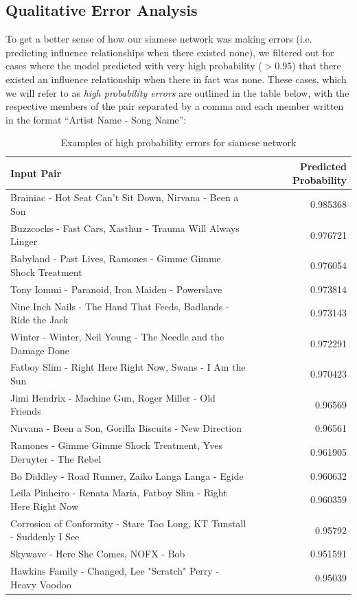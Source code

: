 \subsection{Qualitative Error Analysis}
To get a better sense of how our siamese network was making errors (i.e. predicting influence relationships when there existed none), we filtered out for cases where the model predicted with very high probability ($>0.95$) that there existed an influence relationship when there in fact was none. These cases, which we will refer to as \textit{high probability errors} are outlined in the table below, with the respective members of the pair separated by a comma and each member written in the format ``Artist Name - Song Name'':

\begin{table}[H]
\centering
\caption{Examples of high probability errors for siamese network}
\begin{tabular}{lr}
\hline
 Input Pair                                                             &   Predicted Probability \\
\hline
 Brainiac - Hot Seat Can't Sit Down, Nirvana - Been a Son               &                0.985368 \\
 Buzzcocks - Fast Cars, Xasthur - Trauma Will Always Linger             &                0.976721 \\
 Babyland - Past Lives, Ramones - Gimme Gimme Shock Treatment           &                0.976054 \\
 Tony Iommi - Paranoid, Iron Maiden - Powerslave                        &                0.973814 \\
 Nine Inch Nails - The Hand That Feeds, Badlands - Ride the Jack        &                0.973143 \\
 Winter - Winter, Neil Young - The Needle and the Damage Done           &                0.972291 \\
 Fatboy Slim - Right Here Right Now, Swans - I Am the Sun               &                0.970423 \\
 Jimi Hendrix - Machine Gun, Roger Miller - Old Friends                 &                0.96569  \\
 Nirvana - Been a Son, Gorilla Biscuits - New Direction                 &                0.96561  \\
 Ramones - Gimme Gimme Shock Treatment, Yves Deruyter - The Rebel       &                0.961905 \\
 Bo Diddley - Road Runner, Zaiko Langa Langa - Egide                    &                0.960632 \\
 Leila Pinheiro - Renata Maria, Fatboy Slim - Right Here Right Now      &                0.960359 \\
 Corrosion of Conformity - Stare Too Long, KT Tunstall - Suddenly I See &                0.95792  \\
 Skywave - Here She Comes, NOFX - Bob                                   &                0.951591 \\
 Hawkins Family - Changed, Lee "Scratch" Perry - Heavy Voodoo           &                0.95039  \\
\hline
\end{tabular}
\end{table}

